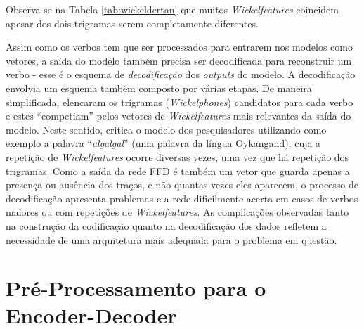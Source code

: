 Observa-se na Tabela \ref{tab:wickeldertan} que muitos \textit{Wickelfeatures} coincidem apesar dos dois trigramas serem completamente diferentes. 

Assim como os verbos tem que ser processados para entrarem nos modelos como vetores, a saída do modelo também precisa ser decodificada para reconstruir um verbo -  esse é o esquema de \textit{decodificação} dos \textit{outputs} do modelo. A decodificação envolvia um esquema também composto por várias etapas. De maneira simplificada, \cite{rumelhart:1986} elencaram os trigramas (\textit{Wickelphones}) candidatos para cada verbo e estes “competiam” pelos vetores de \textit{Wickelfeatures} mais relevantes da saída do modelo. Neste sentido, \cite{Pinker:1999} critica o modelo dos pesquisadores utilizando como exemplo a palavra “\textit{algalgal}” (uma palavra da língua Oykangand), cuja a repetição de \textit{Wickelfeatures} ocorre diversas vezes, uma vez que há repetição dos trigramas. Como a saída da rede FFD é também um vetor que guarda apenas a presença ou ausência dos traços, e não quantas vezes eles aparecem, o processo de decodificação apresenta problemas e a rede dificilmente acerta em casos de verbos maiores ou com repetições de \textit{Wickelfeatures}. As complicações observadas tanto na construção da codificação quanto na decodificação dos dados refletem a necessidade de uma arquitetura mais adequada para o problema em questão.

\section{Pré-Processamento para o Encoder-Decoder}

